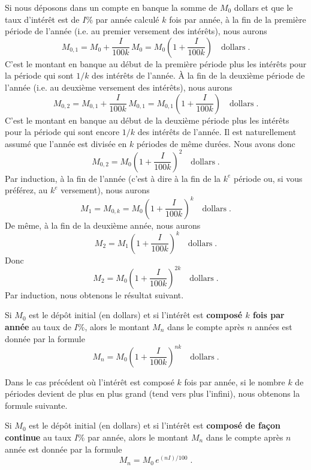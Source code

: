 {Si nous déposons dans un compte en banque la somme de $M_0$ dollars et que le
taux d'intérêt est de $I$\% par année calculé $k$ fois par année, à la fin
de la première période de l'année (i.e. au premier versement des intérêts),
nous aurons
\[
M_{0,1} = M_0+\frac{I}{100k}\,M_0 = M_0\left(1+\frac{I}{100k}\right)
\quad \text{dollars}\; .
\]
C'est le montant en banque au début de la première période plus les intérêts
pour la période qui sont $1/k$ des intérêts de l'année.  À la fin de la
deuxième période de l'année (i.e. au deuxième versement des intérêts), nous
aurons
\[
M_{0,2} = M_{0,1}+\frac{I}{100k}\,M_{0,1}
= M_{0,1}\left(1+\frac{I}{100k}\right)
\quad \text{dollars}\; .
\]
C'est le montant en banque au début de la deuxième période plus les intérêts
pour la période qui sont encore $1/k$ des intérêts de l'année.  Il est
naturellement assumé que l'année est divisée en $k$ périodes de même durées.
Nous avons donc
\[
M_{0,2} = M_0\left(1+\frac{I}{100k}\right)^2 \quad  \text{dollars}\; .
\]
Par induction, à la fin de l'année (c'est à dire à la fin de la $k^e$
période ou, si vous préférez, au $k^e$ versement), nous aurons
\[
M_1 = M_{0,k} = M_0\left(1+\frac{I}{100k}\right)^k \quad
\text{dollars}\; .
\]
De même, à la fin de la deuxième année, nous aurons
\[
M_2 = M_1\left(1+\frac{I}{100k}\right)^k \quad
\text{dollars}\; .
\]
Donc
\[
M_2 = M_0\left(1+\frac{I}{100k}\right)^{2k} \quad
\text{dollars}\; .
\]
Par induction, nous obtenons le résultat suivant.

\begin{focus}{\mth} 
Si $M_0$ est le dépôt initial (en dollars) et si l'intérêt est
{\bfseries composé $k$ fois par année} au taux de $I$\%, alors le
montant $M_n$ dans le compte après $n$ années est donnée par la formule
\[
M_n = M_0\left(1+\frac{I}{100k}\right)^{nk} \quad \text{dollars} \; .
\]
\end{focus}

Dans le cas précédent où l'intérêt est composé $k$ fois par année, si le
nombre $k$ de périodes devient de plus en plus grand (tend vers plus
l'infini), nous obtenons la formule suivante.

\begin{focus}{\mth}  
Si $M_0$ est le dépôt initial (en dollars) et si l'intérêt est
{\bfseries composé de façon continue}
au taux $I$\% par année, alors le montant $M_n$ dans le compte après $n$
année est donnée par la formule
\begin{equation} \label{eco_cont}
M_n = M_0 \, e^{(nI)/100} \; .
\end{equation}
\end{focus}

}
